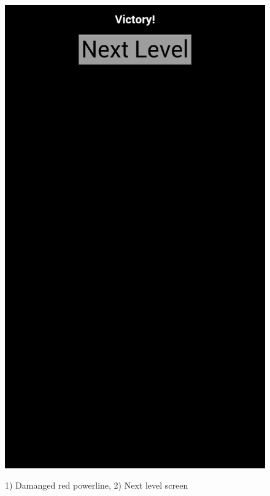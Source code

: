 \begin{figure}[H]
{			\includegraphics[scale=0.18]{pictures/sprint3-screen/nextLevel.png}
		}
		\caption{1) Damanged red powerline, 2) Next level screen}
	\end{figure}

